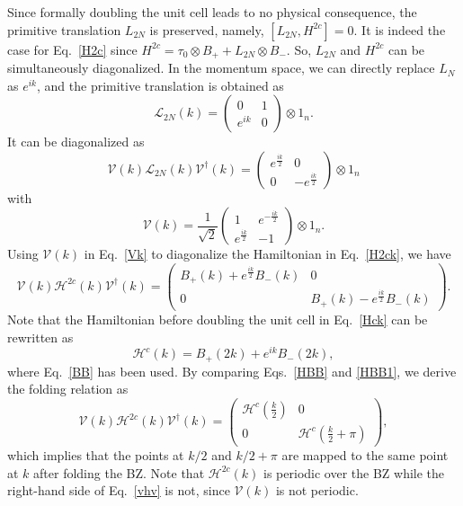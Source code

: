 \documentclass[aps,prl,twocolumn,noshowpacs,superscriptaddress]{revtex4-1}
\def \L {\mathcal{L}}
\def \H {\mathcal{H}}
\begin{document}
Since formally doubling the unit cell leads to no physical consequence, the primitive translation $ L_{2N} $ is preserved, namely, $ [L_{2N}, H^{2c}] =0$. It is indeed the case for Eq.~\eqref{H2c} since $ H^{2c}=\tau_0\otimes B_++L_{2N}\otimes B_- $. So, $ L_{2N} $ and $ H^{2c} $ can be simultaneously diagonalized. In the momentum space, we can directly replace $ L_{N} $ as $ e^{ik} $, and the primitive translation is obtained as
\begin{equation}\label{L-k}
	\L_{2N}(k)=\begin{pmatrix}
		0 & 1 \\ e^{ik} & 0
	\end{pmatrix}\otimes 1_n.
\end{equation}
It can be diagonalized as
\begin{equation}
	\mathcal{V}(k)\L_{2N}(k)\mathcal{V}^\dagger(k)=\begin{pmatrix}
		e^{\frac{ik}{2}} & 0 \\ 0 & -e^{\frac{ik}{2}}
	\end{pmatrix}\otimes 1_n
\end{equation}
with
\begin{equation}\label{Vk}
	\mathcal{V}(k)=\frac{1}{\sqrt{2}}\begin{pmatrix}
		1 & e^{-\frac{ik}{2}} \\ e^{\frac{ik}{2}}& -1
	\end{pmatrix}\otimes 1_n.
\end{equation}
Using $ \mathcal{V}(k) $ in Eq.~\eqref{Vk} to diagonalize the Hamiltonian in Eq.~\eqref{H2ck}, we have
\begin{equation}\label{HBB}
	\mathcal{V}(k) \mathcal{H}^{2c}(k)\mathcal{V}^\dagger(k)=\begin{pmatrix}
		B_+(k)+e^{\frac{ik}{2}}B_-(k) & 0 \\ 0 & B_+(k)-e^{\frac{ik}{2}}B_-(k)
	\end{pmatrix}.
\end{equation}
Note that the Hamiltonian before doubling the unit cell in Eq.~\eqref{Hck} can be rewritten as
\begin{equation}\label{HBB1}
	\mathcal{H}^c(k )=B_+(2k )+e^{ik }B_-(2k ),
\end{equation}
where Eq.~\eqref{BB} has been used. By comparing Eqs.~\eqref{HBB} and \eqref{HBB1}, we derive the folding relation as
\begin{equation}\label{vhv}
	\mathcal{V}(k) \mathcal{H}^{2c}(k)\mathcal{V}^\dagger(k)=\begin{pmatrix}
		\mathcal{H}^c(\frac{k}{2} ) & 0 \\ 0 & \mathcal{H}^c(\frac{k}{2} +\pi) 
	\end{pmatrix},
\end{equation}
which implies that the points at $ k/2 $ and $ k/2+\pi $ are mapped to the same point at $ k $ after folding the BZ. Note that $ \H^{2c}(k) $ is periodic over the BZ while the right-hand side of Eq.~\eqref{vhv} is not, since $ \mathcal{V}(k) $ is not periodic. 
\end{document}
